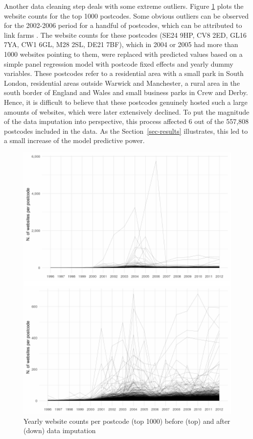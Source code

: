 \documentclass[
  authoryear,
  preprint,
  3p]{elsarticle}
\begin{document}
Another data cleaning step deals with some extreme outliers. Figure
\ref{correct} plots the website counts for the top 1000 postcodes. Some
obvious outliers can be observed for the 2002-2006 period for a handful
of postcodes, which can be attributed to link farms \citep{BL2013links}.
The website counts for these postcodes (SE24 9HP, CV8 2ED, GL16 7YA, CW1
6GL, M28 2SL, DE21 7BF), which in 2004 or 2005 had more than 1000
websites pointing to them, were replaced with predicted values based on
a simple panel regression model with postcode fixed effects and yearly
dummy variables. These postcodes refer to a residential area with a
small park in South London, residential areas outside Warwick and
Manchester, a rural area in the south border of England and Wales and
small business parks in Crew and Derby. Hence, it is difficult to
believe that these postcodes genuinely hosted such a large amounts of
websites, which were later extensively declined. To put the magnitude of
the data imputation into perspective, this process affected 6 out of the
557,808 postcodes included in the data. As the Section~\ref{sec-results}
illustrates, this led to a small increase of the model predictive power.

\begin{figure}[H]

{\centering \includegraphics[width=1\textwidth,height=0.7\textheight]{anonymised_files/figure-pdf/unnamed-chunk-2-1.pdf}

}

\caption{\label{correct}Yearly website counts per postcode (top 1000)
before (top) and after (down) data imputation}

\end{figure}%
\end{document}
